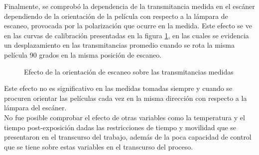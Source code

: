 Finalmente, se comprobó la dependencia de la transmitancia medida en el escáner dependiendo de la orientación de la película con respecto a la lámpara de escaneo, provocada por la polarización que ocurre en la medida. Este efecto se ve en las curvas de calibración presentadas en la figura \ref{fig:efectoOrientacion}, en las cuales se evidencia un desplazamiento en las transmitancias promedio cuando se rota la misma película 90 grados en la misma posición de escaneo.\\
\begin{figure}[H]
	\centering
	\hfill
	\caption{Efecto de la orientación de escaneo sobre las transmitancias medidas}
	\label{fig:efectoOrientacion}
\end{figure}
Este efecto no es significativo en las medidas tomadas siempre y cuando se procuren orientar las películas cada vez en la misma dirección con respecto a la lámpara del escáner.\\

No fue posible comprobar el efecto de otras variables como la temperatura y el tiempo post-exposición dadas las restricciones de tiempo y movilidad que se presentaron en el transcurso del trabajo, además de la poca capacidad de control que se tiene sobre estas variables en el transcurso del proceso.\\

